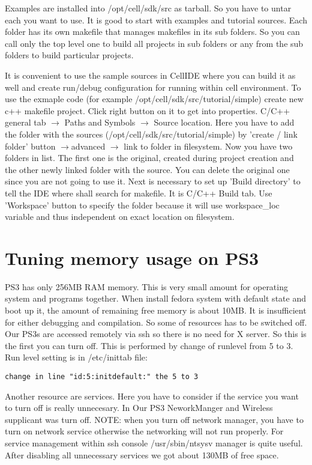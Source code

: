 Examples are installed into /opt/cell/sdk/src as tarball. So you have to untar each you want to use.
It is good to start with examples and tutorial sources.
Each folder has its own makefile that manages makefiles in its sub folders.
 So you can call only the top level one to build all projects in sub folders or any from the sub folders to build particular projects.

It is convenient to use the sample sources in CellIDE where you can build it as well and create run/debug configuration for running within cell environment.
To use the exmaple code (for example /opt/cell/sdk/src/tutorial/simple) create new c++ makefile project.
Click right button on it to get into properties.
C/C++ general tab $\rightarrow$ Paths and Symbols $\rightarrow$ Source location.
Here you have to add the folder with the sources (/opt/cell/sdk/src/tutorial/simple) by 'create / link folder' button $\rightarrow$advanced $\rightarrow$ link to folder in filesystem.
Now you have two folders in list. The first one is the original, created during project creation and the other newly linked folder with the source.
You can delete the original one since you are not going to use it.
Next is necessary to set up 'Build directory' to tell the IDE where shall search for makefile.
It is C/C++ Build tab. Use 'Workspace' button to specify the folder because it will use workspace\_loc variable and thus independent on exact location on filesystem.

\section{Tuning memory usage on PS3}
\label{ps3MemoryUsage}

PS3 has only 256MB RAM memory. This is very small amount for operating system and programs together.
When install fedora system with default state and boot up it, the amount of remaining free memory is about 10MB.
It is insufficient for either debugging and compilation.
So some of resources has to be switched off.
Our PS3s are accessed remotely via ssh so there is no need for X server.
So this is the first you can turn off. This is performed by change of runlevel from 5 to 3.
Run level setting is in /etc/inittab file:
\begin{verbatim}
change in line "id:5:initdefault:" the 5 to 3
\end{verbatim}
Another resource are services.
Here you have to consider if the service you want to turn off is really unnecesary.
In Our PS3 NeworkManger and Wireless supplicant was turn off.
NOTE: when you turn off network manager, you have to turn on network service otherwise the networking will not run properly.
For service management within ssh console /usr/sbin/ntsysv manager is quite useful.
After disabling all unnecessary services we got about 130MB of free space.

